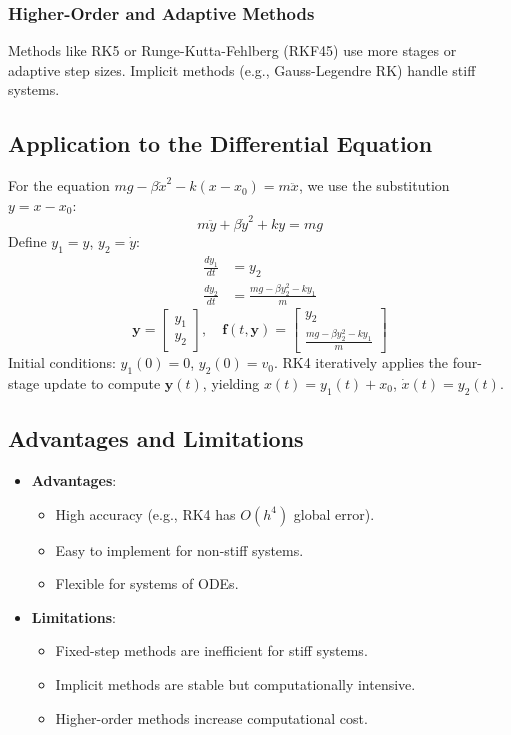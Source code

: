 \documentclass[a4paper,12pt]{article}
\begin{document}
\subsubsection*{Higher-Order and Adaptive Methods}
Methods like RK5 or Runge-Kutta-Fehlberg (RKF45) use more stages or adaptive step sizes. Implicit methods (e.g., Gauss-Legendre RK) handle stiff systems.

\subsection*{Application to the Differential Equation}
For the equation \(mg - \beta \dot{x}^2 - k(x - x_0) = m \ddot{x}\), we use the substitution \(y = x - x_0\):
\begin{equation}
m \ddot{y} + \beta \dot{y}^2 + k y = mg
\end{equation}
Define \(y_1 = y\), \(y_2 = \dot{y}\):
\begin{align}
\frac{dy_1}{dt} &= y_2 \\
\frac{dy_2}{dt} &= \frac{mg - \beta y_2^2 - k y_1}{m}
\end{align}
\[
\mathbf{y} = \begin{bmatrix} y_1 \\ y_2 \end{bmatrix}, \quad \mathbf{f}(t, \mathbf{y}) = \begin{bmatrix} y_2 \\ \frac{mg - \beta y_2^2 - k y_1}{m} \end{bmatrix}
\]
Initial conditions: \(y_1(0) = 0\), \(y_2(0) = v_0\). RK4 iteratively applies the four-stage update to compute \(\mathbf{y}(t)\), yielding \(x(t) = y_1(t) + x_0\), \(\dot{x}(t) = y_2(t)\).

\subsection*{Advantages and Limitations}
\begin{itemize}
    \item \textbf{Advantages}:
    \begin{itemize}
        \item High accuracy (e.g., RK4 has \(O(h^4)\) global error).
        \item Easy to implement for non-stiff systems.
        \item Flexible for systems of ODEs.
    \end{itemize}
    \item \textbf{Limitations}:
    \begin{itemize}
        \item Fixed-step methods are inefficient for stiff systems.
        \item Implicit methods are stable but computationally intensive.
        \item Higher-order methods increase computational cost.
    \end{itemize}
\end{itemize}
\end{document}
